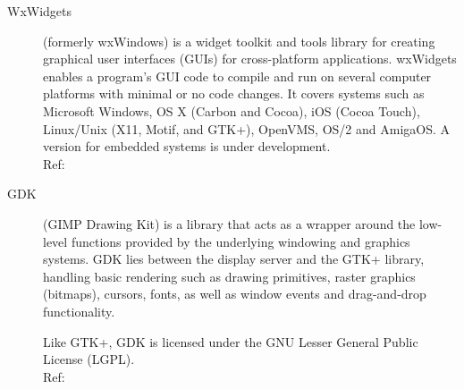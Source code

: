 \begin{description}
    \item[WxWidgets] (formerly wxWindows) is a widget toolkit and tools library
		for creating graphical user interfaces (GUIs) for cross-platform
		applications. wxWidgets enables a program's GUI code to compile
		and run on several computer platforms with minimal or no code
		changes. It covers systems such as Microsoft Windows, OS X
		(Carbon and Cocoa), iOS (Cocoa Touch), Linux/Unix (X11, Motif,
		and GTK+), OpenVMS, OS/2 and AmigaOS. A version for embedded
		systems is under development.
		\hspace*{\fill}\\Ref: \cite{wiki:wxwidget}
    \item[GDK]  (GIMP Drawing Kit) is a library that acts as a wrapper around
		the low-level functions provided by the underlying windowing
		and graphics systems. GDK lies between the display server and
		the GTK+ library, handling basic rendering such as drawing
		primitives, raster graphics (bitmaps), cursors, fonts, as well
		as window events and drag-and-drop functionality.

		Like GTK+, GDK is licensed under the GNU Lesser General
		Public License (LGPL).
		\hspace*{\fill}\\Ref: \cite{wiki:gdk}
\end{description}


